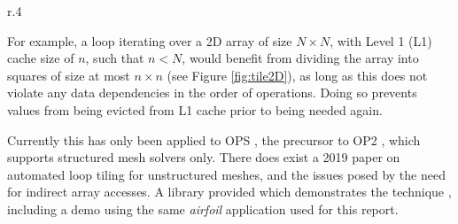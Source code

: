 \begin{wrapfigure}{r}{.4\textwidth}
  \centering
  \caption{2D Loop Tiling}
  \label{fig:tile2D}
  \hspace{-1em}
\end{wrapfigure}
For example, a loop iterating over a 2D array of size $N \times N$, with Level 1 (L1) cache size of $n$, such that $n < N$, would benefit from dividing the array into squares of size at most $n \times n$ (see Figure \ref{fig:tile2D}), as long as this does not violate any data dependencies in the order of operations. Doing so prevents values from being evicted from L1 cache prior to being needed again.\par
Currently this has only been applied to OPS \cite{opstiling}, the precursor to OP2 \cite{opsmain}, which supports structured mesh solvers only. There does exist a 2019 paper \cite{slope} on automated loop tiling for unstructured meshes, and the issues posed by the need for indirect array accesses. A library provided which demonstrates the technique \cite{SLOPErep}, including a demo using the same \textit{airfoil} application used for this report.

